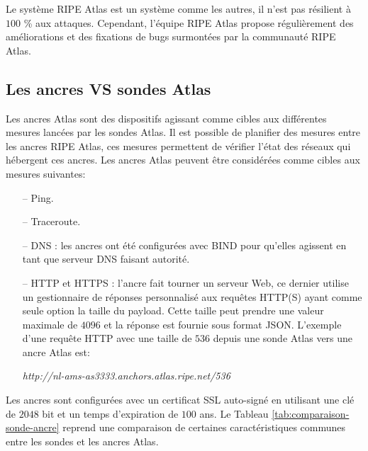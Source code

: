 Le système RIPE Atlas est un système comme les autres, il n'est pas résilient à $100$ \% aux attaques. Cependant, l'équipe RIPE Atlas propose régulièrement des améliorations et des fixations de bugs surmontées par la communauté RIPE Atlas. 


\subsection{Les ancres VS sondes  Atlas} \label{subsec:ancre}

Les ancres  Atlas sont des dispositifs agissant comme cibles aux différentes mesures lancées par les sondes  Atlas. Il est possible de planifier des mesures entre les ancres RIPE Atlas, ces mesures permettent de vérifier l'état des réseaux qui hébergent ces ancres. Les ancres Atlas peuvent être considérées comme  cibles aux mesures suivantes:
\begin{itemize}
	\item[--] Ping.
	\item[--]Traceroute.
	\item[--]DNS : les ancres ont été configurées avec BIND pour qu'elles agissent en tant que serveur DNS faisant autorité.
	\item[--]HTTP et HTTPS : l'ancre fait tourner un serveur Web, ce dernier utilise un gestionnaire de réponses personnalisé aux requêtes HTTP(S) ayant comme seule option la taille du payload. 	 Cette taille peut prendre une valeur maximale de $4096$ et la réponse est fournie sous format JSON. L'exemple d'une requête HTTP avec une taille de $536$ depuis une sonde Atlas vers une ancre Atlas est: 
	\begin{center}
		\begin{tcolorbox}
			\textit{http://nl-ams-as3333.anchors.atlas.ripe.net/536}
		\end{tcolorbox}
	\end{center}
\end{itemize}
Les ancres sont configurées avec un certificat SSL auto-signé en utilisant une clé de $2048$ bit et un temps d'expiration de $100$ ans. Le Tableau \ref{tab:comparaison-sonde-ancre} reprend une comparaison de certaines caractéristiques communes entre les sondes et les ancres  Atlas.

